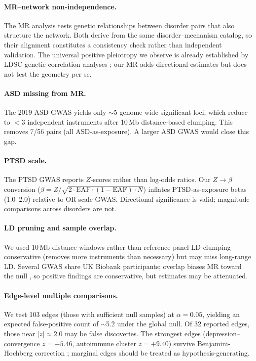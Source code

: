 \documentclass{article}
\begin{document}
\paragraph{MR--network non-independence.} The MR analysis tests genetic relationships between disorder pairs that also structure the network. Both derive from the same disorder--mechanism catalog, so their alignment constitutes a consistency check rather than independent validation. The universal positive pleiotropy we observe is already established by LDSC genetic correlation analyses \citep{buliksullivan2015atlas, anttila2018analysis}; our MR adds directional estimates but does not test the geometry per se.

\paragraph{ASD missing from MR.} The 2019 ASD GWAS \citep{grove2019identification} yields only $\sim$5 genome-wide significant loci, which reduce to $<3$ independent instruments after 10\,Mb distance-based clumping. This removes 7/56 pairs (all ASD-as-exposure). A larger ASD GWAS would close this gap.

\paragraph{PTSD scale.} The PTSD GWAS reports $Z$-scores rather than log-odds ratios. Our $Z \to \beta$ conversion ($\beta = Z / \sqrt{2 \cdot \text{EAF} \cdot (1 - \text{EAF}) \cdot N}$) inflates PTSD-as-exposure betas (1.0--2.0) relative to OR-scale GWAS. Directional significance is valid; magnitude comparisons across disorders are not.

\paragraph{LD pruning and sample overlap.} We used 10\,Mb distance windows rather than reference-panel LD clumping---conservative (removes more instruments than necessary) but may miss long-range LD. Several GWAS share UK Biobank participants; overlap biases MR toward the null \citep{hemani2018mrbase}, so positive findings are conservative, but estimates may be attenuated.

\paragraph{Edge-level multiple comparisons.} We test 103 edges (those with sufficient null samples) at $\alpha = 0.05$, yielding an expected false-positive count of $\sim$5.2 under the global null. Of 32 reported edges, those near $|z| \approx 2.0$ may be false discoveries. The strongest edges (depression--convergence $z = -5.46$, autoimmune cluster $z = +9.40$) survive Benjamini-Hochberg correction \citep{benjamini1995controlling}; marginal edges should be treated as hypothesis-generating.
\end{document}
